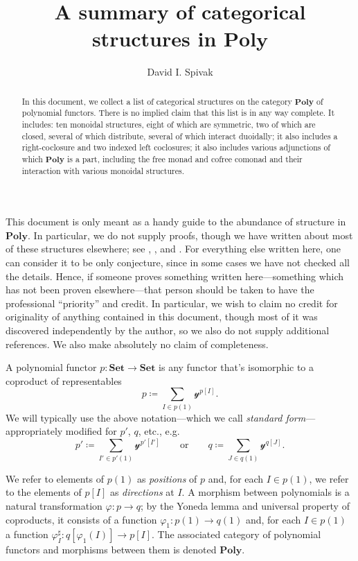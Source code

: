 \documentclass[11pt, one side, article]{memoir}
\theoremstyle{definition}
\theoremstyle{plain}
\newcommand{\Cat}[1]{\mathbf{#1}}%
\newcommand{\smset}{\Cat{Set}}
\newcommand{\yon}{\mathcal{y}}
\newcommand{\poly}{\Cat{Poly}}
\newcommand{\0}{\textsf{0}}
\newcommand{\1}{\tn{\textsf{1}}}
\newcommand{\qqor}{\qquad\text{or}\qquad}
\begin{document}
\title{A summary of categorical structures in $\poly$}

\author{David I. Spivak}


\maketitle

\begin{abstract}
In this document, we collect a list of categorical structures on the category $\poly$ of polynomial functors. There is no implied claim that this list is in any way complete. It includes: ten monoidal structures, eight of which are symmetric, two of which are closed, several of which distribute, several of which interact duoidally; it also includes a right-coclosure and two indexed left coclosures; it also includes various adjunctions of which $\poly$ is a part, including the free monad and cofree comonad and their interaction with various monoidal structures. 
\end{abstract}


\tableofcontents*
\bigskip

This document is only meant as a handy guide to the abundance of structure in $\poly$. In particular, we do not supply proofs, though we have written about most of these structures elsewhere; see \cite{spivak2022poly}, \cite{spivak2021functorial}, and \cite{spivak2022polynomial}. For everything else written here, one can consider it to be only conjecture, since in some cases we have not checked all the details. Hence, if someone proves something written here---something which has not been proven elsewhere---that person should be taken to have the professional ``priority'' and credit. In particular, we wish to claim no credit for originality of anything contained in this document, though most of it was discovered independently by the author, so we also do not supply additional references. We also make absolutely no claim of completeness.

\bigskip

A polynomial functor $p\colon\smset\to\smset$ is any functor that's isomorphic to a coproduct of representables
\[
p\coloneqq\sum_{I\in p(1)}\yon^{p[I]}.
\]
We will typically use the above notation---which we call \emph{standard form}---appropriately modified for $p'$, $q$, etc., e.g.
\[
p'\coloneqq\sum_{I'\in p'(1)}\yon^{p'[I']}
\qqor
q\coloneqq\sum_{J\in q(1)}\yon^{q[J]}.
\]

We refer to elements of $p(1)$ as \emph{positions} of $p$ and, for each $I\in p(1)$, we refer to the elements of $p[I]$ as \emph{directions} at $I$. A morphism between polynomials is a natural transformation $\varphi\colon p\to q$; by the Yoneda lemma and universal property of coproducts, it consists of a function $\varphi_1\colon p(1)\to q(1)$ and, for each $I\in p(1)$ a function $\varphi^\sharp_I\colon q[\varphi_1(I)]\to p[I]$. The associated category of polynomial functors and morphisms between them is denoted $\poly$. 
\end{document}
